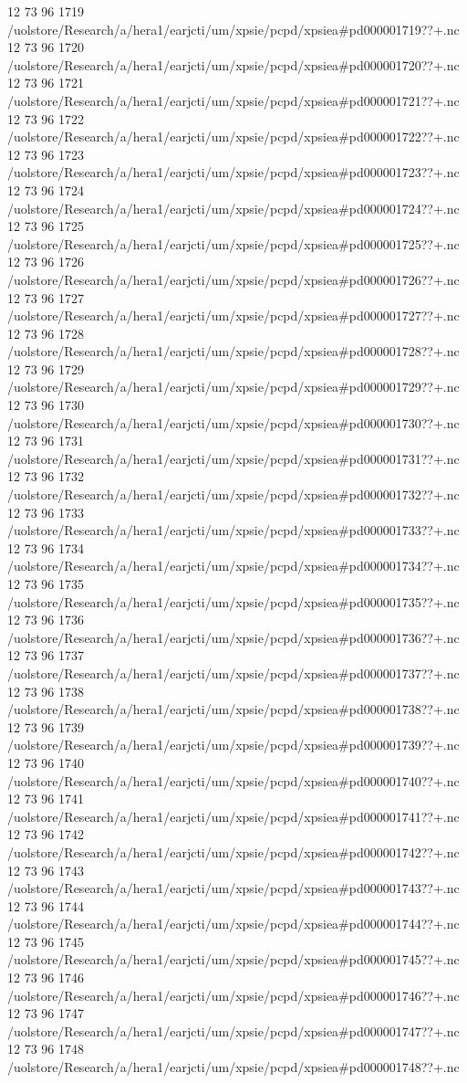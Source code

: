 12 73 96
1719
/uolstore/Research/a/hera1/earjcti/um/xpsie/pcpd/xpsiea#pd000001719??+.nc
12 73 96
1720
/uolstore/Research/a/hera1/earjcti/um/xpsie/pcpd/xpsiea#pd000001720??+.nc
12 73 96
1721
/uolstore/Research/a/hera1/earjcti/um/xpsie/pcpd/xpsiea#pd000001721??+.nc
12 73 96
1722
/uolstore/Research/a/hera1/earjcti/um/xpsie/pcpd/xpsiea#pd000001722??+.nc
12 73 96
1723
/uolstore/Research/a/hera1/earjcti/um/xpsie/pcpd/xpsiea#pd000001723??+.nc
12 73 96
1724
/uolstore/Research/a/hera1/earjcti/um/xpsie/pcpd/xpsiea#pd000001724??+.nc
12 73 96
1725
/uolstore/Research/a/hera1/earjcti/um/xpsie/pcpd/xpsiea#pd000001725??+.nc
12 73 96
1726
/uolstore/Research/a/hera1/earjcti/um/xpsie/pcpd/xpsiea#pd000001726??+.nc
12 73 96
1727
/uolstore/Research/a/hera1/earjcti/um/xpsie/pcpd/xpsiea#pd000001727??+.nc
12 73 96
1728
/uolstore/Research/a/hera1/earjcti/um/xpsie/pcpd/xpsiea#pd000001728??+.nc
12 73 96
1729
/uolstore/Research/a/hera1/earjcti/um/xpsie/pcpd/xpsiea#pd000001729??+.nc
12 73 96
1730
/uolstore/Research/a/hera1/earjcti/um/xpsie/pcpd/xpsiea#pd000001730??+.nc
12 73 96
1731
/uolstore/Research/a/hera1/earjcti/um/xpsie/pcpd/xpsiea#pd000001731??+.nc
12 73 96
1732
/uolstore/Research/a/hera1/earjcti/um/xpsie/pcpd/xpsiea#pd000001732??+.nc
12 73 96
1733
/uolstore/Research/a/hera1/earjcti/um/xpsie/pcpd/xpsiea#pd000001733??+.nc
12 73 96
1734
/uolstore/Research/a/hera1/earjcti/um/xpsie/pcpd/xpsiea#pd000001734??+.nc
12 73 96
1735
/uolstore/Research/a/hera1/earjcti/um/xpsie/pcpd/xpsiea#pd000001735??+.nc
12 73 96
1736
/uolstore/Research/a/hera1/earjcti/um/xpsie/pcpd/xpsiea#pd000001736??+.nc
12 73 96
1737
/uolstore/Research/a/hera1/earjcti/um/xpsie/pcpd/xpsiea#pd000001737??+.nc
12 73 96
1738
/uolstore/Research/a/hera1/earjcti/um/xpsie/pcpd/xpsiea#pd000001738??+.nc
12 73 96
1739
/uolstore/Research/a/hera1/earjcti/um/xpsie/pcpd/xpsiea#pd000001739??+.nc
12 73 96
1740
/uolstore/Research/a/hera1/earjcti/um/xpsie/pcpd/xpsiea#pd000001740??+.nc
12 73 96
1741
/uolstore/Research/a/hera1/earjcti/um/xpsie/pcpd/xpsiea#pd000001741??+.nc
12 73 96
1742
/uolstore/Research/a/hera1/earjcti/um/xpsie/pcpd/xpsiea#pd000001742??+.nc
12 73 96
1743
/uolstore/Research/a/hera1/earjcti/um/xpsie/pcpd/xpsiea#pd000001743??+.nc
12 73 96
1744
/uolstore/Research/a/hera1/earjcti/um/xpsie/pcpd/xpsiea#pd000001744??+.nc
12 73 96
1745
/uolstore/Research/a/hera1/earjcti/um/xpsie/pcpd/xpsiea#pd000001745??+.nc
12 73 96
1746
/uolstore/Research/a/hera1/earjcti/um/xpsie/pcpd/xpsiea#pd000001746??+.nc
12 73 96
1747
/uolstore/Research/a/hera1/earjcti/um/xpsie/pcpd/xpsiea#pd000001747??+.nc
12 73 96
1748
/uolstore/Research/a/hera1/earjcti/um/xpsie/pcpd/xpsiea#pd000001748??+.nc
